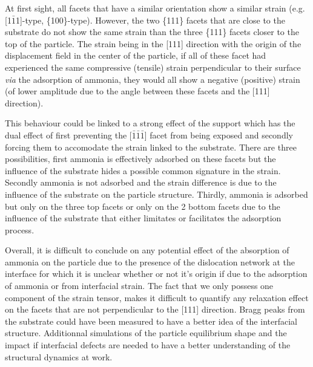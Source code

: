 At first sight, all facets that have a similar orientation show a similar strain (e.g. [1$\bar{1}$1]-type, \{100\}-type).
However, the two \{111\} facets that are close to the substrate do not show the same strain than the three \{111\} facets closer to the top of the particle.
The strain being in the [111] direction with the origin of the displacement field in the center of the particle, if all of these facet had experienced the same compressive (tensile) strain perpendicular to their surface \textit{via} the adsorption of ammonia, they would all show a negative (positive) strain (of lower amplitude due to the angle between these facets and the [111] direction).

This behaviour could be linked to a strong effect of the support which has the dual effect of first preventing the [$\bar{1}\bar{1}\bar{1}$] facet from being exposed and secondly forcing them to accomodate the strain linked to the substrate.
There are three possibilities, first ammonia is effectively adsorbed on these facets but the influence of the substrate hides a possible common signature in the strain.
Secondly ammonia is not adsorbed and the strain difference is due to the influence of the substrate on the particle structure.
Thirdly, ammonia is adsorbed but only on the three top facets or only on the 2 bottom facets due to the influence of the substrate that either limitates or facilitates the adsorption process.



Overall, it is difficult to conclude on any potential effect of the absorption of ammonia on the particle due to the presence of the dislocation network at the interface for which it is unclear whether or not it's origin if due to the adsorption of ammonia or from interfacial strain.
The fact that we only possess one component of the strain tensor, makes it difficult to quantify any relaxation effect on the facets that are not perpendicular to the [111] direction.
Bragg peaks from the substrate could have been measured to have a better idea of the interfacial structure.
Additionnal simulations of the particle equilibrium shape and the impact if interfacial defects are needed to have a better understanding of the structural dynamics at work.

